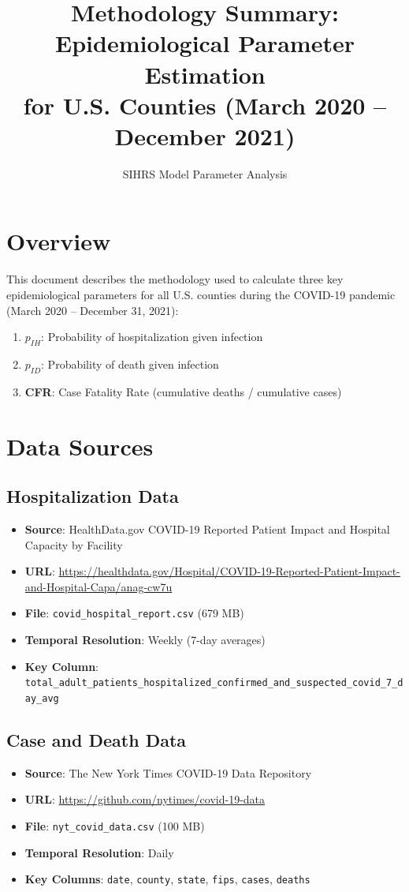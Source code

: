 \documentclass[11pt]{article}
\title{Methodology Summary: Epidemiological Parameter Estimation\\for U.S. Counties (March 2020 -- December 2021)}
\author{SIHRS Model Parameter Analysis}
\date{}
\begin{document}
\maketitle

\section{Overview}

This document describes the methodology used to calculate three key epidemiological parameters for all U.S. counties during the COVID-19 pandemic (March 2020 -- December 31, 2021):

\begin{enumerate}
    \item \textbf{$p_{IH}$}: Probability of hospitalization given infection
    \item \textbf{$p_{ID}$}: Probability of death given infection
    \item \textbf{CFR}: Case Fatality Rate (cumulative deaths / cumulative cases)
\end{enumerate}

\section{Data Sources}

\subsection{Hospitalization Data}
\begin{itemize}
    \item \textbf{Source}: HealthData.gov COVID-19 Reported Patient Impact and Hospital Capacity by Facility
    \item \textbf{URL}: \url{https://healthdata.gov/Hospital/COVID-19-Reported-Patient-Impact-and-Hospital-Capa/anag-cw7u}
    \item \textbf{File}: \texttt{covid\_hospital\_report.csv} (679 MB)
    \item \textbf{Temporal Resolution}: Weekly (7-day averages)
    \item \textbf{Key Column}: \texttt{total\_adult\_patients\_hospitalized\_confirmed\_and\_suspected\_covid\_7\_day\_avg}
\end{itemize}

\subsection{Case and Death Data}
\begin{itemize}
    \item \textbf{Source}: The New York Times COVID-19 Data Repository
    \item \textbf{URL}: \url{https://github.com/nytimes/covid-19-data}
    \item \textbf{File}: \texttt{nyt\_covid\_data.csv} (100 MB)
    \item \textbf{Temporal Resolution}: Daily
    \item \textbf{Key Columns}: \texttt{date}, \texttt{county}, \texttt{state}, \texttt{fips}, \texttt{cases}, \texttt{deaths}
\end{itemize}
\end{document}
